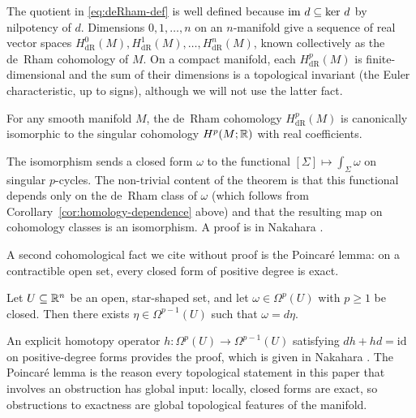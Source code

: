 \noindent The quotient in \eqref{eq:deRham-def} is well defined because $\operatorname{im}\, d \subseteq \operatorname{ker}\, d$ by nilpotency of $d$. Dimensions $0, 1, \ldots, n$ on an $n$-manifold give a sequence of real vector spaces $H^0_{\mathrm{dR}}(M), H^1_{\mathrm{dR}}(M), \ldots, H^n_{\mathrm{dR}}(M)$, known collectively as the de~Rham cohomology of $M$. On a compact manifold, each $H^p_{\mathrm{dR}}(M)$ is finite-dimensional and the sum of their dimensions is a topological invariant (the Euler characteristic, up to signs), although we will not use the latter fact.

\begin{theorem}\label{thm:deRham-iso}
For any smooth manifold $M$, the de~Rham cohomology $H^p_{\mathrm{dR}}(M)$ is canonically isomorphic to the singular cohomology $H^p(M; \mathbb{R})$ with real coefficients.
\end{theorem}

The isomorphism sends a closed form $\omega$ to the functional $[\Sigma] \mapsto \int_\Sigma \omega$ on singular $p$-cycles. The non-trivial content of the theorem is that this functional depends only on the de~Rham class of $\omega$ (which follows from Corollary~\ref{cor:homology-dependence} above) and that the resulting map on cohomology classes is an isomorphism. A proof is in Nakahara \cite{Nakahara2003GTP}.

\medskip

\noindent A second cohomological fact we cite without proof is the Poincar\'e lemma: on a contractible open set, every closed form of positive degree is exact.

\begin{proposition}\label{prop:poincare-lemma}
Let $U \subseteq \mathbb{R}^n$ be an open, star-shaped set, and let $\omega \in \Omega^p(U)$ with $p \geq 1$ be closed. Then there exists $\eta \in \Omega^{p-1}(U)$ such that $\omega = d\eta$.
\end{proposition}

An explicit homotopy operator $h : \Omega^p(U) \to \Omega^{p-1}(U)$ satisfying $dh + hd = \mathrm{id}$ on positive-degree forms provides the proof, which is given in Nakahara \cite{Nakahara2003GTP}. The Poincar\'e lemma is the reason every topological statement in this paper that involves an obstruction has global input: locally, closed forms are exact, so obstructions to exactness are global topological features of the manifold.

